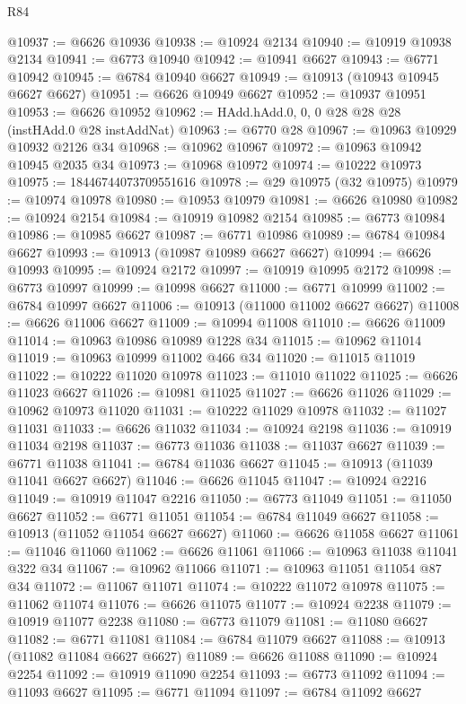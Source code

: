 \begin{lexlean}{R84}
\begin{coremodule}
@10937 := @6626 @10936
@10938 := @10924 @2134
@10940 := @10919 @10938 @2134
@10941 := @6773 @10940
@10942 := @10941 @6627
@10943 := @6771 @10942
@10945 := @6784 @10940 @6627
@10949 := @10913 (@10943 @10945 @6627 @6627)
@10951 := @6626 @10949 @6627
@10952 := @10937 @10951
@10953 := @6626 @10952
@10962 := HAdd.hAdd.{0, 0, 0} @28 @28 @28 (instHAdd.{0} @28 instAddNat)
@10963 := @6770 @28
@10967 := @10963 @10929 @10932 @2126 @34
@10968 := @10962 @10967
@10972 := @10963 @10942 @10945 @2035 @34
@10973 := @10968 @10972
@10974 := @10222 @10973
@10975 := 18446744073709551616
@10978 := @29 @10975 (@32 @10975)
@10979 := @10974 @10978
@10980 := @10953 @10979
@10981 := @6626 @10980
@10982 := @10924 @2154
@10984 := @10919 @10982 @2154
@10985 := @6773 @10984
@10986 := @10985 @6627
@10987 := @6771 @10986
@10989 := @6784 @10984 @6627
@10993 := @10913 (@10987 @10989 @6627 @6627)
@10994 := @6626 @10993
@10995 := @10924 @2172
@10997 := @10919 @10995 @2172
@10998 := @6773 @10997
@10999 := @10998 @6627
@11000 := @6771 @10999
@11002 := @6784 @10997 @6627
@11006 := @10913 (@11000 @11002 @6627 @6627)
@11008 := @6626 @11006 @6627
@11009 := @10994 @11008
@11010 := @6626 @11009
@11014 := @10963 @10986 @10989 @1228 @34
@11015 := @10962 @11014
@11019 := @10963 @10999 @11002 @466 @34
@11020 := @11015 @11019
@11022 := @10222 @11020 @10978
@11023 := @11010 @11022
@11025 := @6626 @11023 @6627
@11026 := @10981 @11025
@11027 := @6626 @11026
@11029 := @10962 @10973 @11020
@11031 := @10222 @11029 @10978
@11032 := @11027 @11031
@11033 := @6626 @11032
@11034 := @10924 @2198
@11036 := @10919 @11034 @2198
@11037 := @6773 @11036
@11038 := @11037 @6627
@11039 := @6771 @11038
@11041 := @6784 @11036 @6627
@11045 := @10913 (@11039 @11041 @6627 @6627)
@11046 := @6626 @11045
@11047 := @10924 @2216
@11049 := @10919 @11047 @2216
@11050 := @6773 @11049
@11051 := @11050 @6627
@11052 := @6771 @11051
@11054 := @6784 @11049 @6627
@11058 := @10913 (@11052 @11054 @6627 @6627)
@11060 := @6626 @11058 @6627
@11061 := @11046 @11060
@11062 := @6626 @11061
@11066 := @10963 @11038 @11041 @322 @34
@11067 := @10962 @11066
@11071 := @10963 @11051 @11054 @87 @34
@11072 := @11067 @11071
@11074 := @10222 @11072 @10978
@11075 := @11062 @11074
@11076 := @6626 @11075
@11077 := @10924 @2238
@11079 := @10919 @11077 @2238
@11080 := @6773 @11079
@11081 := @11080 @6627
@11082 := @6771 @11081
@11084 := @6784 @11079 @6627
@11088 := @10913 (@11082 @11084 @6627 @6627)
@11089 := @6626 @11088
@11090 := @10924 @2254
@11092 := @10919 @11090 @2254
@11093 := @6773 @11092
@11094 := @11093 @6627
@11095 := @6771 @11094
@11097 := @6784 @11092 @6627

\end{coremodule}
\end{lexlean}
